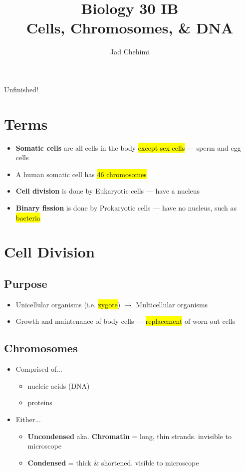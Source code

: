 \documentclass[a4paper,12pt]{article}
\title{Biology 30 IB \\ Cells, Chromosomes, \& DNA}
\author{Jad Chehimi}
\begin{document}
\maketitle

\begin{center}
\Huge
Unfinished!
\normalsize
\end{center}

\tableofcontents

\pagebreak

\section{Terms}
\begin{itemize}
    \item{\textbf{Somatic cells} are all cells in the body \hl{except sex cells} --- sperm and egg cells}
    \item{A human somatic cell has \hl{46 chromosomes}}
    \item{\textbf{Cell division} is done by Eukaryotic cells --- have a nucleus}
    \item{\textbf{Binary fission} is done by Prokaryotic cells --- have no nucleus, such as \hl{bacteria}}
\end{itemize}

\section{Cell Division}
\subsection{Purpose}
\begin{itemize}
    \item{Unicellular organisms (i.e. \hl{zygote}) $\longrightarrow$ Multicellular organisms}
    \item{Growth and maintenance of body cells --- \hl{replacement} of worn out cells}
\end{itemize}

\subsection{Chromosomes}
\begin{itemize}
    \item{
            Comprised of...
            \begin{itemize}
                \item{nucleic acids (DNA)}
                \item{proteins}
            \end{itemize}
        }
    \item{
            Either...
            \begin{itemize}
                \item{\textbf{Uncondensed} aka. \textbf{Chromatin} = long, thin strands. invisible to microscope}
                \item{\textbf{Condensed} = thick \& shortened. visible to microscope}
            \end{itemize}
        }
\end{itemize}
\end{document}
